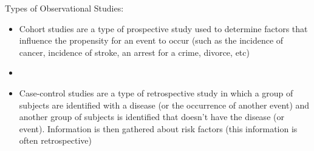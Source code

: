 \documentclass[xcolor=dvipsnames]{beamer}
\begin{document}
\begin{frame}{Types of Observational Studies:}
	\begin{itemize}
		\item Cohort studies are a type of prospective study used to determine factors that influence the propensity for an event to occur (such as the incidence of cancer, incidence of stroke, an arrest for a crime, divorce, etc)
		\item[]
		\item Case-control studies are a type of retrospective study in which a group of subjects are identified with a disease (or the occurrence of another event) and another group of subjects is identified that doesn't have the disease (or event). Information is then gathered about risk factors (this information is often retrospective)
	\end{itemize}
\end{frame}
\end{document}

